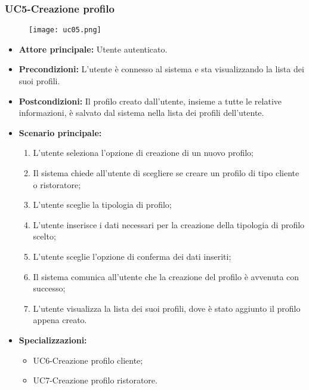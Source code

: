\pagebreak
\subsubsection{UC5-Creazione profilo}
\begin{figure}[h] \texttt{[image: uc05.png]} \end{figure}
\begin{itemize}
    \item \textbf{Attore principale:} Utente autenticato.
    \item \textbf{Precondizioni:} L'utente è connesso al sistema e sta visualizzando la lista dei suoi profili.
    \item \textbf{Postcondizioni:} Il profilo creato dall'utente, insieme a tutte le relative informazioni,
    è salvato dal sistema nella lista dei profili dell'utente.
    \item \textbf{Scenario principale:}
    \begin{enumerate}
        \item L'utente seleziona l'opzione di creazione di un nuovo profilo;
        \item Il sistema chiede all'utente di scegliere se creare un profilo di tipo cliente
        o ristoratore;
        \item L'utente sceglie la tipologia di profilo;
        \item L'utente inserisce i dati necessari per la creazione della tipologia di profilo scelto;
        \item L'utente sceglie l'opzione di conferma dei dati inseriti;
        \item Il sistema comunica all'utente che la creazione del profilo è avvenuta con successo;
        \item L'utente visualizza la lista dei suoi profili, dove è stato aggiunto il profilo appena creato.
    \end{enumerate}
    \item \textbf{Specializzazioni:}
        \begin{itemize}
            \item UC6-Creazione profilo cliente;
            \item UC7-Creazione profilo ristoratore.
        \end{itemize}
\end{itemize}

